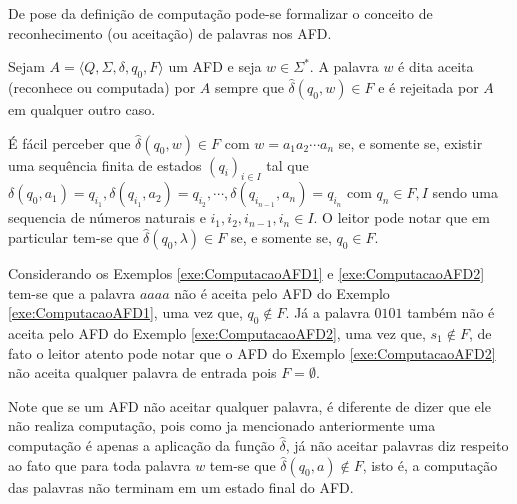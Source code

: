 De pose da definição de computação pode-se formalizar o conceito de reconhecimento (ou aceitação) de palavras nos AFD.

\begin{definition}\label{defi:PalavraAceitaPorAFD}
	\cite{benjaLivro2010} Sejam $A = \langle Q, \Sigma, \delta, q_0, F\rangle$ um AFD e seja $w \in \Sigma^*$. A palavra $w$ é dita aceita (reconhece ou computada) por $A$ sempre que $\widehat{\delta}(q_0, w) \in F$ e é rejeitada por $A$ em qualquer outro caso.
\end{definition}

É fácil perceber que $\widehat{\delta}(q_0, w) \in F$ com $w = a_1a_2\cdots a_n$ se, e somente se, existir uma sequência finita de estados $(q_i)_{i \in I}$ tal que $\delta(q_0, a_1) = q_{i_1}, \delta(q_{i_1}, a_2) = q_{i_2}, \cdots, \delta(q_{i_{n-1}}, a_{n}) = q_{i_n}$ com $q_n \in F, I$ sendo uma sequencia de números naturais e $i_1, i_2, i_{n-1}, i_n \in I$. O leitor pode notar que em particular tem-se que $\widehat{\delta}(q_0, \lambda) \in F$ se, e somente se, $q_0 \in F$.

\begin{example}\label{exe:AceiteAFD1}
	Considerando os Exemplos \ref{exe:ComputacaoAFD1} e \ref{exe:ComputacaoAFD2} tem-se que a palavra $aaaa$ não é aceita pelo AFD do Exemplo \ref{exe:ComputacaoAFD1}, uma vez que, $q_0 \notin F$. Já a palavra $0101$ também não é aceita pelo AFD do Exemplo \ref{exe:ComputacaoAFD2}, uma vez que, $s_1 \notin F$, de fato o leitor atento pode notar que o AFD do Exemplo \ref{exe:ComputacaoAFD2} não aceita qualquer palavra de entrada pois $F = \emptyset$.
\end{example}

\begin{remark}
	Note que se um AFD não aceitar qualquer palavra, é diferente de dizer que ele não realiza computação, pois como ja mencionado anteriormente uma computação é apenas a aplicação da função $\widehat{\delta}$, já não aceitar palavras diz respeito ao fato que para toda palavra $w$ tem-se que $\widehat{\delta}(q_0, a) \notin F$, isto é, a computação das palavras não terminam em um estado final do AFD.
\end{remark}

